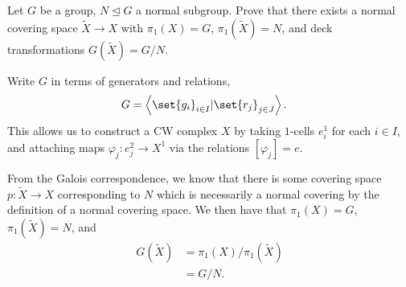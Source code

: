 \documentclass[10pt]{mypackage}
\begin{document}
\begin{problem}[Problem 3]
  Let $G$ be a group, $N\trianglelefteq G$ a normal subgroup. Prove that there exists a normal covering space $\widetilde{X}\rightarrow X$ with $\pi_1(X) = G$, $\pi_1\left( \widetilde{X} \right) = N$, and deck transformations $ G\left( \widetilde{X} \right) = G/N $.
\end{problem}
\begin{solution}
  Write $G$ in terms of generators and relations,
  \begin{align*}
    G &= \left\langle \set{g_i}_{i\in I} | \set{r_j}_{j\in J} \right\rangle.
  \end{align*}
  This allows us to construct a CW complex $X$ by taking $1$-cells $e^1_i$ for each $i\in I$, and attaching maps $\varphi_j\colon e^2_j\rightarrow X^1$ via the relations $\left[ \varphi_j \right] = e$.

  From the Galois correspondence, we know that there is some covering space $ p\colon \widetilde{X}\rightarrow X $ corresponding to $N$ which is necessarily a normal covering by the definition of a normal covering space. We then have that $\pi_1\left( X \right) = G$, $\pi_1\left( \widetilde{X} \right) = N$, and
  \begin{align*}
    G\left( \widetilde{X} \right) &= \pi_1(X)/\pi_1\left( \widetilde{X} \right)\\
                                  &= G/N.
  \end{align*}
\end{solution}
\end{document}
